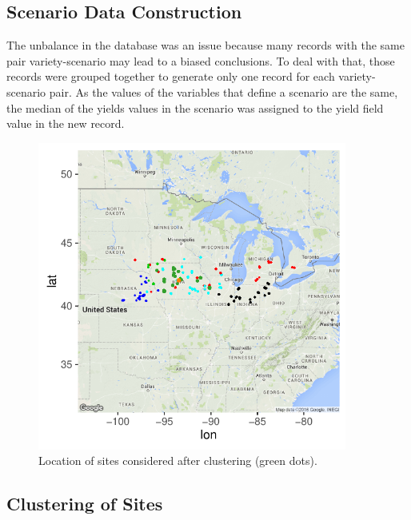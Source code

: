 \documentclass[syngen,nonblindrev]{informs3-syngen}
\begin{document}
\subsection{Scenario Data Construction}

The unbalance in the database was an issue because many records with the same pair variety-scenario may lead to a biased conclusions. 
To deal with that, those records were grouped together to generate only one record for each variety-scenario pair. 
As the values of the variables that define a scenario are the same, the median of the yields values in the scenario was assigned to the yield field value in the new record.

\begin{figure}[t]
\begin{center}
\includegraphics[height=4in]{map1}
\caption{Location of sites considered after clustering (green dots).} \label{map}
\end{center}
\end{figure}

\subsection{Clustering of Sites}
\end{document}
